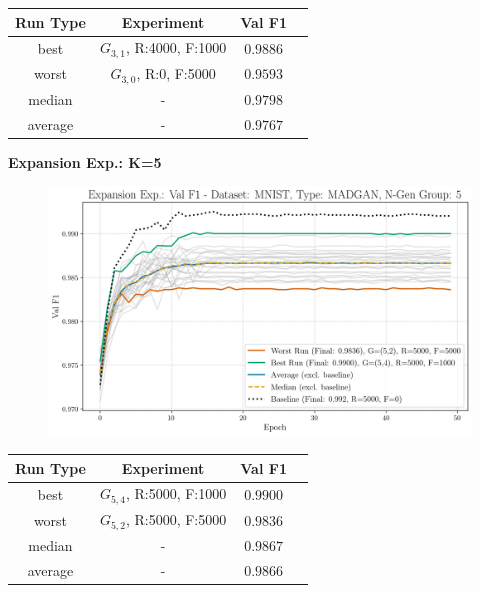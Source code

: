 \begin{table}[H]
	\vspace{-1.5em}
	\centering
	\begin{tabular}{|c|c|c|c|}
		\hline
		Run Type & Experiment & Val F1 \\ \hline
		best & \(G_{3, 1}\), R:4000, F:1000 & $0.9886$\\ \hline
		worst & \(G_{3, 0}\), R:0, F:5000 & $0.9593$\\ \hline
		median & - & $0.9798$\\ \hline
		average & - & $0.9767$
		\\ \hline
	\end{tabular}
\end{table}
\newpage
\noindent\textbf{Expansion Exp.: K=5}
\begin{figure}[htbp]
	\centering
	\includegraphics[width=.85\textwidth]{abb/strat_classifier_performance/MNIST_STRATIFIED_CLASSIFIERS_MADGAN_NEW/expansion_experiments/val_f1_score_MADGAN_MNIST_n_gen_5_all.png}
	\label{fig:app_strat_class_performance_expansion_exp._val_f1_score_5}
\end{figure}
\begin{table}[H]
	\vspace{-1em}
	\centering
	\begin{tabular}{|c|c|c|c|}
		\hline
		Run Type & Experiment & Val F1 \\ \hline
		best & \(G_{5, 4}\), R:5000, F:1000 & $0.9900$\\ \hline
		worst & \(G_{5, 2}\), R:5000, F:5000 & $0.9836$\\ \hline
		median & - & $0.9867$\\ \hline
		average & - & $0.9866$
		\\ \hline
	\end{tabular}
\end{table}
